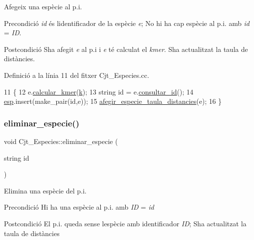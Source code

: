 Afegeix una espècie al p.\+i. 

\begin{DoxyPrecond}{Precondició}
{\itshape id} és l\textquotesingle{}identificador de la espècie {\itshape e}; No hi ha cap espècie al p.\+i. amb {\itshape id} = {\itshape ID}. 
\end{DoxyPrecond}
\begin{DoxyPostcond}{Postcondició}
S\textquotesingle{}ha afegit {\itshape e} al p.\+i i {\itshape e} té calculat el {\itshape kmer}. S\textquotesingle{}ha actualitzat la taula de distàncies. 
\end{DoxyPostcond}


Definició a la línia 11 del fitxer Cjt\+\_\+\+Especies.\+cc.


\begin{DoxyCode}
11                                             \{
12     e.\hyperlink{class_especie_a83fdef791142b0887bfa7f45bd0d5e0e}{calcular\_kmer}(\hyperlink{class_cjt___especies_a4586fb4724b7af4b7f00bb0c0bdd6a17}{k});
13     \textcolor{keywordtype}{string} \textcolor{keywordtype}{id} = e.\hyperlink{class_especie_a1652f05cd2ff7dc71123bf538ecc4476}{consultar\_id}();
14     \hyperlink{class_cjt___especies_aa232ab8543b78ea6d8ecaa1e5f9ccef5}{esp}.insert(make\_pair(\textcolor{keywordtype}{id},e));
15     \hyperlink{class_cjt___especies_aed10769d0831e7b92fb0a602bce7766a}{afegir\_especie\_taula\_distancies}(e);
16 \}
\end{DoxyCode}
\mbox{\label{class_cjt___especies_af47e196f53a7e4f69dda79b9b8f709b1}} 
\subsubsection{\texorpdfstring{eliminar\+\_\+especie()}{eliminar\_especie()}}
{\footnotesize\ttfamily void Cjt\+\_\+\+Especies\+::eliminar\+\_\+especie (\begin{DoxyParamCaption}\item[{string}]{id }\end{DoxyParamCaption})}



Elimina una espècie del p.\+i. 

\begin{DoxyPrecond}{Precondició}
Hi ha una espècie al p.\+i. amb {\itshape ID} = {\itshape id} 
\end{DoxyPrecond}
\begin{DoxyPostcond}{Postcondició}
El p.\+i. queda sense l\textquotesingle{}espècie amb identificador {\itshape ID}; S\textquotesingle{}ha actualitzat la taula de distàncies 
\end{DoxyPostcond}


